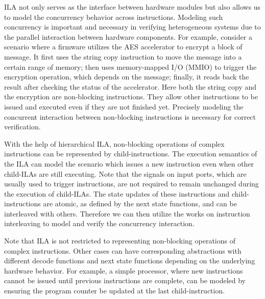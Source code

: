 
ILA not only serves as the interface between hardware modules but 
also allows us to model the concurrency behavior across instructions. 
Modeling such concurrency is important and necessary in verifying heterogeneous 
systems due to the parallel interaction between hardware components.
%
For example, consider a scenario where a firmware utilizes the AES accelerator
to encrypt a block of message. 
It first uses the string copy instruction to move the message into a certain
range of memory; then uses memory-mapped I/O (MMIO) to trigger the encryption
operation, which depends on the message; finally, it reads back the result after
checking the status of the accelerator.
%
Here both the string copy and the encryption are non-blocking instructions. 
They allow other instructions to be issued and executed even if they are not
finished yet.
Precisely modeling the concurrent interaction between non-blocking instructions 
is necessary for correct verification.

With the help of hierarchical ILA, non-blocking operations of complex 
instructions can be represented by child-instructions.
The execution semantics of the ILA can model the scenario which issues a new
instruction even when other child-ILAs are still executing.
%
Note that the signals on input ports, which are usually used to trigger 
instructions, are not required to remain unchanged during the execution of 
child-ILAs.
The state updates of these instructions and child-instructions are atomic, as 
defined by the next state functions, and can be interleaved with others.
%
Therefore we can then utilize the works on instruction interleaving to model
and verify the concurrency interaction.

Note that ILA is not restricted to representing non-blocking operations of 
complex instructions. 
Other cases can have corresponding abstractions with different decode 
functions and next state functions depending on the underlying hardware behavior.
For example, a simple processor, where new instructions cannot be issued until
previous instructions are complete, can be modeled by ensuring the program
counter be updated at the last child-instruction.
